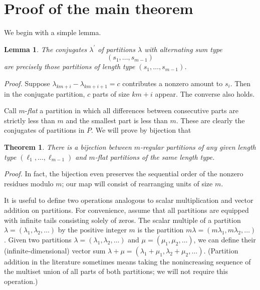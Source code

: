 \documentclass{amsart}
\newtheorem{theorem}{Theorem}
\newtheorem{lemma}{Lemma}
\begin{document}









\section{Proof of the main theorem}

We begin with a simple lemma.

\begin{lemma}\label{conj} The conjugates $\lambda^{\prime}$ of partitions $\lambda$ with alternating sum type $$(s_1,\dots,s_{m-1})$$ are precisely those partitions of length type $(s_1,\dots,s_{m-1})$.
\end{lemma}

\emph{Proof.} Suppose $\lambda_{km+i} - \lambda_{km+i+1} = c$ contributes a nonzero amount to $s_i$.  Then in the conjugate partition, $c$ parts of size $km+i$ appear.  The converse also holds.


Call $m$-\emph{flat} a partition in which all differences between consecutive parts are strictly less than $m$ and the smallest part is less than $m$.  These are clearly the conjugates of partitions in $P$.  We will prove by bijection that

\begin{theorem} There is a bijection between $m$-regular partitions of any given length type $(\ell_1,\dots,\ell_{m-1})$ and $m$-flat partitions of the same length type.
\end{theorem}

\emph{Proof.} In fact, the bijection even preserves the sequential order of the nonzero residues modulo $m$; our map will consist of rearranging units of size $m$.

It is useful to define two operations analogous to scalar multiplication and vector addition on partitions.  For convenience, assume that all partitions are equipped with infinite tails consisting solely of zeros.  The scalar multiple of a partition $\lambda = (\lambda_1,\lambda_2,\dots)$ by the positive integer $m$ is the partition $m \lambda = (m \lambda_1,m \lambda_2,\dots)$.  Given two partitions $\lambda = (\lambda_1,\lambda_2,\dots)$ and $\mu = (\mu_1,\mu_2,\dots)$, we can define their (infinite-dimensional) vector sum $\lambda + \mu = (\lambda_1+\mu_1,\lambda_2 + \mu_2,\dots)$.  (Partition addition in the literature sometimes means taking the nonincreasing sequence of the multiset union of all parts of both partitions; we will not require this operation.)
\end{document}
